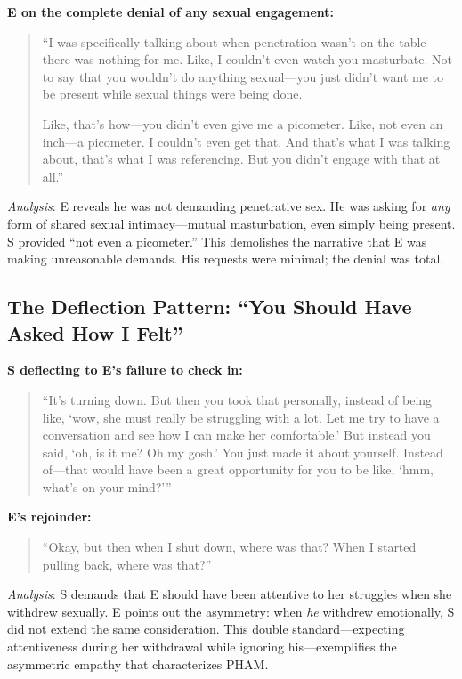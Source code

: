 \documentclass[12pt,openany]{book}
\numberwithin{equation}{chapter}
\begin{document}
\textbf{E on the complete denial of any sexual engagement:}
\begin{quote}
``I was specifically talking about when penetration wasn't on the table---there was nothing for me. Like, I couldn't even watch you masturbate. Not to say that you wouldn't do anything sexual---you just didn't want me to be present while sexual things were being done.

Like, that's how---you didn't even give me a picometer. Like, not even an inch---a picometer. I couldn't even get that. And that's what I was talking about, that's what I was referencing. But you didn't engage with that at all.''
\end{quote}

\textit{Analysis}: E reveals he was not demanding penetrative sex. He was asking for \textit{any} form of shared sexual intimacy---mutual masturbation, even simply being present. S provided ``not even a picometer.'' This demolishes the narrative that E was making unreasonable demands. His requests were minimal; the denial was total.

\subsection{The Deflection Pattern: ``You Should Have Asked How I Felt''}

\textbf{S deflecting to E's failure to check in:}
\begin{quote}
``It's turning down. But then you took that personally, instead of being like, `wow, she must really be struggling with a lot. Let me try to have a conversation and see how I can make her comfortable.' But instead you said, `oh, is it me? Oh my gosh.' You just made it about yourself. Instead of---that would have been a great opportunity for you to be like, `hmm, what's on your mind?'''
\end{quote}

\textbf{E's rejoinder:}
\begin{quote}
``Okay, but then when I shut down, where was that? When I started pulling back, where was that?''
\end{quote}

\textit{Analysis}: S demands that E should have been attentive to her struggles when she withdrew sexually. E points out the asymmetry: when \textit{he} withdrew emotionally, S did not extend the same consideration. This double standard---expecting attentiveness during her withdrawal while ignoring his---exemplifies the asymmetric empathy that characterizes PHAM.
\end{document}
